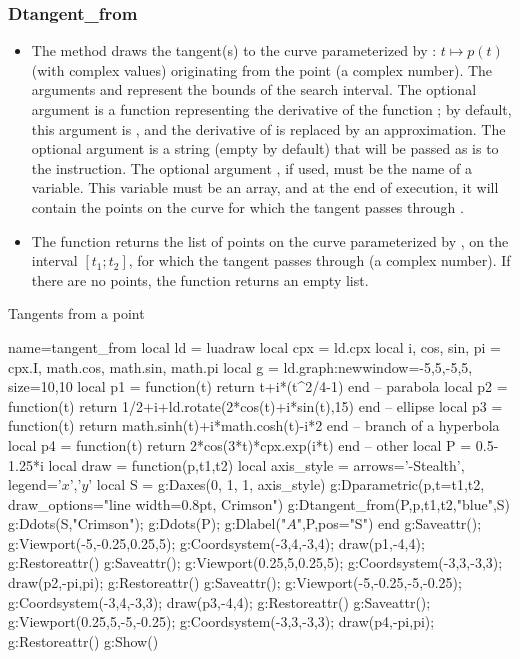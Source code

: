 \subsubsection{Dtangent\_from}

\begin{itemize}
    \item The method  draws the tangent(s) to the curve parameterized by : \(t \mapsto p(t)\) (with complex values) originating from the point  (a complex number). The arguments  and  represent the bounds of the search interval. The optional argument  is a function representing the derivative of the function ; by default, this argument is \nil, and the derivative of  is replaced by an approximation. The optional argument  is a string (empty by default) that will be passed as is to the \drawcmd instruction. The optional argument , if used, must be the name of a variable. This variable must be an array, and at the end of execution, it will contain the points on the curve for which the tangent passes through . \arguScale

    \item The function  returns the list of points on the curve parameterized by , on the interval \([t_1;t_2]\), for which the tangent passes through  (a complex number). If there are no points, the function returns an empty list.
\end{itemize}

\begin{demo}{Tangents from a point}
\begin{luadraw}{name=tangent_from}
local ld = luadraw
local cpx = ld.cpx
local i, cos, sin, pi = cpx.I, math.cos, math.sin, math.pi
local g = ld.graph:new{window={-5,5,-5,5}, size={10,10}}
local p1 = function(t) return t+i*(t^2/4-1) end -- parabola
local p2 = function(t) return 1/2+i+ld.rotate(2*cos(t)+i*sin(t),15) end -- ellipse
local p3 = function(t) return math.sinh(t)+i*math.cosh(t)-i*2 end -- branch of a hyperbola
local p4 = function(t) return 2*cos(3*t)*cpx.exp(i*t) end -- other
local P = 0.5-1.25*i
local draw = function(p,t1,t2)
    local axis_style = { arrows='-Stealth', legend={'$x$','$y$'} }
    local S = {}
    g:Daxes({0, 1, 1}, axis_style)
    g:Dparametric(p,{t={t1,t2}, draw_options="line width=0.8pt, Crimson"})
    g:Dtangent_from(P,p,t1,t2,"blue",S)
    g:Ddots(S,"Crimson"); g:Ddots(P); g:Dlabel("$A$",P,{pos="S"})
end
g:Saveattr(); g:Viewport(-5,-0.25,0.25,5); g:Coordsystem(-3,4,-3,4); draw(p1,-4,4); g:Restoreattr()
g:Saveattr(); g:Viewport(0.25,5,0.25,5); g:Coordsystem(-3,3,-3,3); draw(p2,-pi,pi); g:Restoreattr()
g:Saveattr(); g:Viewport(-5,-0.25,-5,-0.25); g:Coordsystem(-3,4,-3,3); draw(p3,-4,4); g:Restoreattr()
g:Saveattr(); g:Viewport(0.25,5,-5,-0.25); g:Coordsystem(-3,3,-3,3); draw(p4,-pi,pi); g:Restoreattr()
g:Show()
\end{luadraw}
\end{demo}

